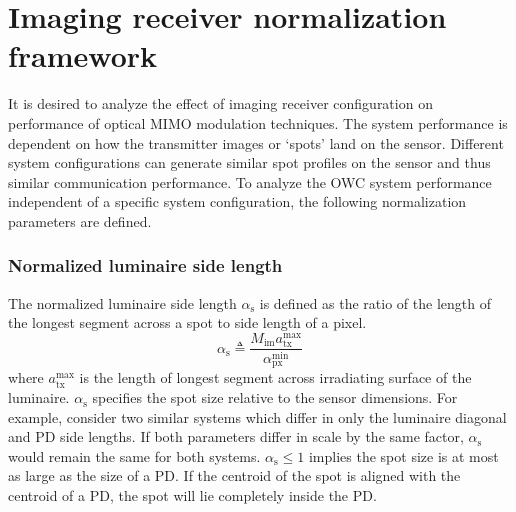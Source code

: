 \section{Imaging receiver normalization framework}
\label{sec:mimoImagingFramework}
\graphicspath{{_MIMOSpace/figures_osm/}}

It is desired to analyze the effect of imaging receiver configuration on performance of optical MIMO modulation techniques. The system performance is dependent on how the transmitter images or `spots' land on the sensor. Different system configurations can generate similar spot profiles on the sensor and thus similar communication  performance. To analyze the OWC system performance independent of a specific system configuration, the following normalization parameters are defined.

\subsubsection{Normalized luminaire side length}
\label{subsubsec:frameworkSide}
The normalized luminaire side length $\alpha_{\text{s}}$ is defined as the ratio of the length of the longest segment across a spot to side length of a pixel. 
\begin{equation}
	\label{eqAlphaS}
	\alpha_{\text{s}} \triangleq \frac{M_{\text{im}} a_{\text{tx}}^{\text{max}}}{\alpha_{\text{px}}^{\text{min}}}
\end{equation}
where $a_{\text{tx}}^{\text{max}}$ is the length of longest segment across irradiating surface of the luminaire. $\alpha_{\text{s}}$ specifies the spot size relative to the sensor dimensions. For example, consider two similar systems which differ in only the luminaire diagonal and PD side lengths. If both parameters differ in scale by the same factor, $\alpha_{\text{s}}$ would remain the same for both systems. $\alpha_{\text{s}}\leq 1$ implies the spot size is at most as large as the size of a PD. If the centroid of the spot is aligned with the centroid of a PD, the spot will lie completely inside the PD.
 
